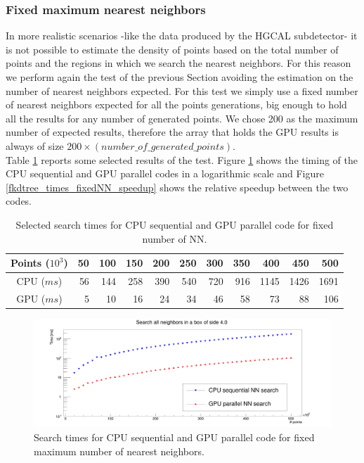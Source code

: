 \subsubsection{Fixed maximum nearest neighbors}
In more realistic scenarios -like the data produced by the HGCAL subdetector- it is not possible to estimate the density of points based on the total number of points and the regions in which we search the nearest neighbors. For this reason we perform again the test of the previous Section avoiding the estimation on the number of nearest neighbors expected. For this test we simply use a fixed number of nearest neighbors expected for all the points generations, big enough to hold all the results for any number of generated points. We chose 200 as the maximum number of expected results, therefore the array that holds the GPU results is always of size $200 \times (number\_of\_generated\_points)$.\\
Table \ref{fkdtree_times_fixedNN_tab} reports some selected results of the test. Figure \ref{fkdtree_times_fixedNN_searches} shows the timing of the CPU sequential and GPU parallel codes in a logarithmic scale and Figure \ref{fkdtree_times_fixedNN_speedup} shows the relative speedup between the two codes.\\

\begin{center}
\begin{table}[h]
\begin{tabular}{ c || r r r r r r r r r r }
Points ($10^{3}$) & 50 & 100 & 150 & 200 & 250 & 300 & 350 & 400 & 450 & 500 \\
\hline
CPU ($\unit{ms}$) & 56 & 144 & 258 & 390 & 540 & 720 & 916 & 1145 & 1426 & 1691 \\
GPU ($\unit{ms}$) & 5 & 10 & 16 & 24 & 34 & 46 & 58 & 73 & 88 & 106 \\
\end{tabular}
\caption{Selected search times for CPU sequential and GPU parallel code for fixed number of NN.}
\label{fkdtree_times_fixedNN_tab}
\end{table}
\end{center}

\begin{figure}
\includegraphics[width=\textwidth]{fkdtree/fixed200/fkdSearchTimes.png}
\caption{Search times for CPU sequential and GPU parallel code for fixed maximum number of nearest neighbors.}
\label{fkdtree_times_fixedNN_searches}
\end{figure}

